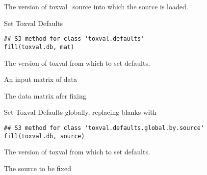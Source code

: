 \documentclass[letterpaper]{book}
\begin{document}
%
\begin{Arguments}
\begin{ldescription}
\item[\code{db}] The version of toxval\_source into which the source is loaded.
\end{ldescription}
\end{Arguments}
%
\begin{Description}\relax
Set Toxval Defaults
\end{Description}
%
\begin{Usage}
\begin{verbatim}
## S3 method for class 'toxval.defaults'
fill(toxval.db, mat)
\end{verbatim}
\end{Usage}
%
\begin{Arguments}
\begin{ldescription}
\item[\code{toxval.db}] The version of toxval from which to set defaults.

\item[\code{mat}] An input matrix of data
\end{ldescription}
\end{Arguments}
%
\begin{Value}
The data matrix afer fixing
\end{Value}
%
\begin{Description}\relax
Set Toxval Defaults globally,  replacing blanks with -
\end{Description}
%
\begin{Usage}
\begin{verbatim}
## S3 method for class 'toxval.defaults.global.by.source'
fill(toxval.db, source)
\end{verbatim}
\end{Usage}
%
\begin{Arguments}
\begin{ldescription}
\item[\code{toxval.db}] The version of toxval from which to set defaults.

\item[\code{source}] The source to be fixed
\end{ldescription}
\end{Arguments}
\end{document}
